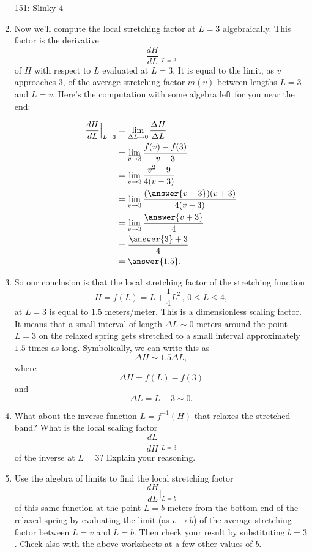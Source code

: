 \documentclass{ximera}
\begin{document}
\begin{example}
\begin{enumerate}
\href{https://www.desmos.com/calculator/zsbupxubm6}{151: Slinky 4}


\item Now we'll compute the local stretching factor at $L=3$ algebraically. This factor is the derivative
\[
  \frac{dH}{dL}\Big|_{L=3} 
\]
of $H$ with respect to $L$ evaluated at $L=3$. It is equal to the limit, as $v$ approaches $3$, of the average stretching factor $m(v)$ between lengths $L=3$ and $L=v$. Here's the computation with some algebra left for you near the end:

\begin{align*}
  \frac{dH}{dL}\Big|_{L=3} &= \lim_{\Delta L \to 0} \frac{\Delta H}{\Delta L} \\
              &= \lim_{v\to 3}\frac{f(v) - f(3)}{v-3} \\
              &= \lim_{v\to 3}\frac{v^2-9}{4(v-3)}   \\
              &= \lim_{v\to 3} \frac{(\answer{v-3})(v+3)}{4(v-3)} \\
              &=  \lim_{v\to 3} \frac{\answer{v+3}}{4} \\
              &= \frac{\answer{3}+3}{4}  \\
              &= \answer{1.5} .
\end{align*}

\item So our conclusion is that the local stretching factor of the stretching function
\[
      H = f(L) = L + \frac{1}{4}L^2 \, , \, 0\leq L \leq 4,
\]
at $L=3$ is equal to $1.5$ meters/meter. This is a dimensionless scaling factor. It means that a small interval of length $\Delta L\sim 0$ meters around the point $L=3$ on the relaxed spring gets stretched to a small interval approximately $1.5$ times as long. Symbolically, we can write this as
\[
          \Delta H \sim 1.5\Delta L,
\]
where
\[
   \Delta H = f(L) - f(3)
\]
and 
\[
    \Delta L = L - 3 \sim 0 .
\]

\item What about the inverse function $L=f^{-1}(H)$ that relaxes the stretched band? What is the local scaling factor
\[
   \frac{dL}{dH}\Big|_{L=3}
\]
of the inverse at $L=3$? Explain your reasoning.

\item Use the algebra of limits to find the local stretching factor
\[
  \frac{dH}{dL}\Big|_{L=b}
\]
of this same function at the point $L=b$ meters from the bottom end of the relaxed spring by evaluating the limit (as $v\to b$) of the average stretching factor between $L=v$ and $L=b$. Then check your result by substituting $b=3$. Check also with the above worksheets at a few other values of $b$.
\end{enumerate}

\end{example}
\end{document}

